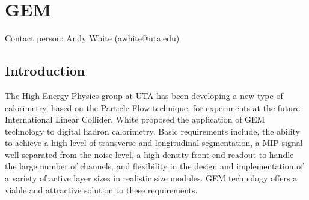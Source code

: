 \section{GEM}
Contact person: Andy White (awhite@uta.edu)
\subsection{Introduction}
The High Energy Physics group at UTA has been developing a new type of calorimetry, based on the Particle Flow technique, for experiments at the future International Linear Collider. White proposed the application of GEM~\cite{Sauli1997531} technology to digital hadron calorimetry. Basic requirements include, the ability to achieve a high level of transverse and longitudinal segmentation, a MIP signal well separated from the noise level, a high density front-end readout to handle the large number of channels, and flexibility in the design and implementation of a variety of active layer sizes in realistic size modules. GEM technology offers a viable and attractive solution to these requirements.
